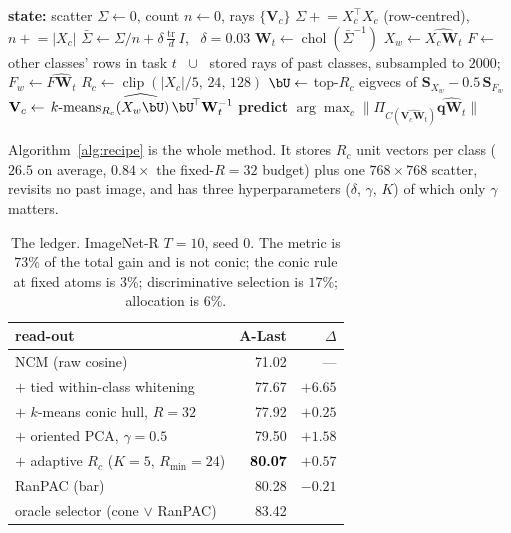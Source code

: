 \documentclass[10pt,twocolumn]{article}
\newcommand{\bq}{\mathbf{q}}
\newcommand{\bV}{\mathbf{V}}
\newcommand{\bW}{\mathbf{W}}
\newcommand{\bS}{\mathbf{S}}
\newcommand{\good}[1]{\textcolor{black}{\textbf{#1}}}
\begin{document}
\begin{algorithm}[t]
\small
\caption{Best raw conic classifier (oPCA-$k5m24$)}
\label{alg:recipe}
\begin{algorithmic}[1]
\State \textbf{state:} scatter $\Sigma\!\leftarrow\!0$, count $n\!\leftarrow\!0$,
       rays $\{\bV_c\}$
    \State $\Sigma \mathrel{+}= X_c^{\!\top}X_c$ (row-centred), $n\mathrel{+}=|X_c|$
  \EndFor
  \State $\bar\Sigma \leftarrow \Sigma/n + \delta\tfrac{\operatorname{tr}}{d}I$,
         \ $\delta{=}0.03$
  \State $\bW_t \leftarrow \operatorname{chol}(\bar\Sigma^{-1})$
    \State $X_w \leftarrow \widehat{X_c\bW_t}$
    \State $F \leftarrow$ other classes' rows in task $t$ \ $\cup$ \ stored rays
           of past classes, subsampled to $2000$; $F_w\leftarrow\widehat{F\bW_t}$
    \State $R_c \leftarrow \operatorname{clip}(|X_c|/5,\,24,\,128)$
    \State $\bU \leftarrow$ top-$R_c$ eigvecs of
           $\bS_{X_w}-0.5\,\bS_{F_w}$ 
    \State $\bV_c \leftarrow \widehat{\,k\text{-means}_{R_c}(X_w\bU)\,\bU^{\!\top}\bW_t^{-1}}$
  \EndFor
  \State \textbf{predict} $\arg\max_c\lVert\Pi_{C(\widehat{\bV_c\bW_t})}\widehat{\bq\bW_t}\rVert$
\EndFor
\end{algorithmic}
\end{algorithm}

Algorithm~\ref{alg:recipe} is the whole method. It stores $R_c$ unit vectors per
class ($26.5$ on average, $0.84\times$ the fixed-$R{=}32$ budget) plus one
$768\times768$ scatter, revisits no past image, and has three hyperparameters
($\delta$, $\gamma$, $K$) of which only $\gamma$ matters.

\begin{table}[t]\centering\small
\begin{tabular}{lrr}
\toprule
read-out & A-Last & $\Delta$ \\
\midrule
NCM (raw cosine)                       & 71.02 & --- \\
\quad$+$ tied within-class whitening   & 77.67 & $+6.65$ \\
\quad$+$ $k$-means conic hull, $R{=}32$& 77.92 & $+0.25$ \\
\quad$+$ oriented PCA, $\gamma{=}0.5$  & 79.50 & $+1.58$ \\
\quad$+$ adaptive $R_c$ ($K{=}5$, $R_{\min}{=}24$)
                                       & \good{80.07} & $+0.57$ \\
\midrule
RanPAC (bar)                           & 80.28 & $-0.21$ \\
oracle selector (cone $\vee$ RanPAC)   & 83.42 & \\
\bottomrule
\end{tabular}
\caption{The ledger. ImageNet-R $T{=}10$, seed 0. The metric is $73\%$ of the
total gain and is not conic; the conic rule at fixed atoms is $3\%$;
discriminative selection is $17\%$; allocation is $6\%$.}
\label{tab:ledger}
\end{table}
\end{document}
